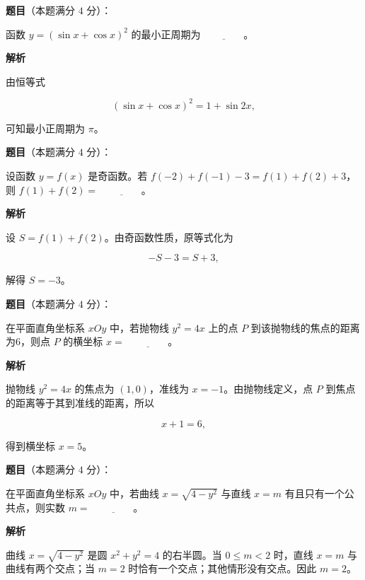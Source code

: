 \begin{answer}

\textbf{题目}（本题满分 $4$ 分）：

函数 $y=(\sin x+\cos x)^2$ 的最小正周期为 $\underline{\qquad\qquad}$。

\textbf{解析}

由恒等式

\nopagebreak[4]
\[
(\sin x+\cos x)^2=1+\sin2x,
\]

可知最小正周期为 $\pi$。


\end{answer}
\begin{answer}

\textbf{题目}（本题满分 $4$ 分）：

设函数 $y=f(x)$ 是奇函数。若 $f(-2)+f(-1)-3=f(1)+f(2)+3$，则 $f(1)+f(2)=$ $\underline{\qquad\qquad}$。

\textbf{解析}

设 $S=f(1)+f(2)$。由奇函数性质，原等式化为

\nopagebreak[4]
\[
-S-3=S+3,
\]

解得 $S=-3$。


\end{answer}
\begin{answer}

\textbf{题目}（本题满分 $4$ 分）：

在平面直角坐标系 $xOy$ 中，若抛物线 $y^2=4x$ 上的点 $P$ 到该抛物线的焦点的距离为6，则点 $P$ 的横坐标 $x=$ $\underline{\qquad\qquad}$。

\textbf{解析}

抛物线 $y^2=4x$ 的焦点为 $(1,0)$，准线为 $x=-1$。由抛物线定义，点 $P$ 到焦点的距离等于其到准线的距离，所以

\nopagebreak[4]
\[
x+1=6,
\]

得到横坐标 $x=5$。


\end{answer}
\begin{answer}

\textbf{题目}（本题满分 $4$ 分）：

在平面直角坐标系 $xOy$ 中，若曲线 $x=\sqrt{4-y^2}$ 与直线 $x=m$ 有且只有一个公共点，则实数 $m=$ $\underline{\qquad\qquad}$。

\textbf{解析}

曲线 $x=\sqrt{4-y^2}$ 是圆 $x^2+y^2=4$ 的右半圆。当 $0\le m<2$ 时，直线 $x=m$ 与曲线有两个交点；当 $m=2$ 时恰有一个交点；其他情形没有交点。因此 $m=2$。


\end{answer}
